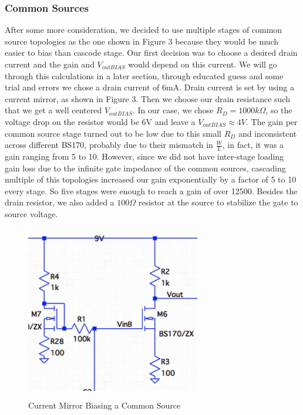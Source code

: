 \documentclass[11pt, twoside, letterpaper]{article}
\begin{document}
\subsubsection{Common Sources}
After some more consideration, we decided to use multiple stages of common source topologies as the one shown in Figure 3 because they would 
be much easier to bias than cascode stage. Our first decision was to choose a desired drain current and the gain and $V_{outBIAS}$
would depend on this current. We will go through this calculations in a later section, through educated guess and some trial and errors we 
chose a drain current of 6mA. Drain current is set by using a current mirror, as shown in Figure 3. Then we choose our drain 
resistance such that we get a well centered $V_{outBIAS}$. In our case, we chose $R_D=1000k\Omega$, so the voltage drop on the resistor would be 
6V and leave a $V_{outBIAS}\approx 4V$. The gain per common source stage turned out to be low due to this small $R_D$ and inconsistent across different 
BS170, probably due to their mismatch in $\frac{W}{L}$, in fact, it was a gain ranging from 5 to 10. However, since we did not have inter-stage loading 
gain loss due to the infinite gate impedance of the common sources, cascading multiple of this topologies increased our gain exponentially by a factor
of 5 to 10 every stage. So five stages were enough to reach a gain of over 12500. Besides the drain resistor, we also added a $100\Omega$ resistor 
at the source to stabilize the gate to source voltage.

\begin{figure}[htbp]
\begin{center}
\includegraphics[width=3in,height=3in]{CurrentMirror.png}
\caption{Current Mirror Biasing a Common Source}
\end{center}
\end{figure}
\FloatBarrier
\end{document}
